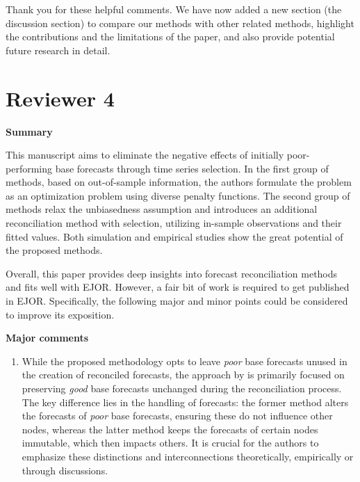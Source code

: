 \documentclass[11pt,a4paper,]{article}
\providecommand{\tightlist}{%
  \setlength{\itemsep}{0pt}\setlength{\parskip}{0pt}}
\renewenvironment{quote}
               {\list{}{\rightmargin\leftmargin}%
                \item\relax\color[RGB]{0,150,0}}
               {\endlist}
\begin{document}
\begin{quote}
Thank you for these helpful comments. We have now added a new section
(the discussion section) to compare our methods with other related
methods, highlight the contributions and the limitations of the paper,
and also provide potential future research in detail.
\end{quote}

\section{Reviewer 4}\label{reviewer-4}

\textbf{Summary}

This manuscript aims to eliminate the negative effects of initially
poor-performing base forecasts through time series selection. In the
first group of methods, based on out-of-sample information, the authors
formulate the problem as an optimization problem using diverse penalty
functions. The second group of methods relax the unbiasedness assumption
and introduces an additional reconciliation method with selection,
utilizing in-sample observations and their fitted values. Both
simulation and empirical studies show the great potential of the
proposed methods.

Overall, this paper provides deep insights into forecast reconciliation
methods and fits well with EJOR. However, a fair bit of work is required
to get published in EJOR. Specifically, the following major and minor
points could be considered to improve its exposition.

\textbf{Major comments}

\begin{enumerate}
\def\labelenumi{\arabic{enumi}.}
\tightlist
\item
  While the proposed methodology opts to leave \emph{poor} base
  forecasts unused in the creation of reconciled forecasts, the approach
  by \textcite{Zhang2023-op} is primarily focused on preserving
  \emph{good} base forecasts unchanged during the reconciliation
  process. The key difference lies in the handling of forecasts: the
  former method alters the forecasts of \emph{poor} base forecasts,
  ensuring these do not influence other nodes, whereas the latter method
  keeps the forecasts of certain nodes immutable, which then impacts
  others. It is crucial for the authors to emphasize these distinctions
  and interconnections theoretically, empirically or through
  discussions.
\end{enumerate}
\end{document}

